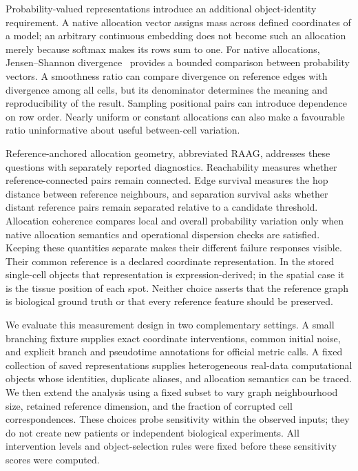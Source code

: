 \documentclass[11pt]{article}
\begin{document}
Probability-valued representations introduce an additional object-identity requirement. A native allocation vector assigns mass across defined coordinates of a model; an arbitrary continuous embedding does not become such an allocation merely because softmax makes its rows sum to one. For native allocations, Jensen--Shannon divergence~\cite{lin1991divergence} provides a bounded comparison between probability vectors. A smoothness ratio can compare divergence on reference edges with divergence among all cells, but its denominator determines the meaning and reproducibility of the result. Sampling positional pairs can introduce dependence on row order. Nearly uniform or constant allocations can also make a favourable ratio uninformative about useful between-cell variation.

{ Reference-anchored allocation geometry, abbreviated RAAG, addresses these questions with separately reported diagnostics. Reachability measures whether reference-connected pairs remain connected. Edge survival measures the hop distance between reference neighbours, and separation survival asks whether distant reference pairs remain separated relative to a candidate threshold. Allocation coherence compares local and overall probability variation only when native allocation semantics and operational dispersion checks are satisfied. Keeping these quantities separate makes their different failure responses visible. Their common reference is a declared coordinate representation. In the stored single-cell objects that representation is expression-derived; in the spatial case it is the tissue position of each spot. Neither choice asserts that the reference graph is biological ground truth or that every reference feature should be preserved.\par}

We evaluate this measurement design in two complementary settings. A small branching fixture supplies exact coordinate interventions, common initial noise, and explicit branch and pseudotime annotations for official metric calls. A fixed collection of saved representations supplies heterogeneous real-data computational objects whose identities, duplicate aliases, and allocation semantics can be traced. We then extend the analysis using a fixed subset to vary graph neighbourhood size, retained reference dimension, and the fraction of corrupted cell correspondences. These choices probe sensitivity within the observed inputs; they do not create new patients or independent biological experiments. All intervention levels and object-selection rules were fixed before these sensitivity scores were computed.
\end{document}
